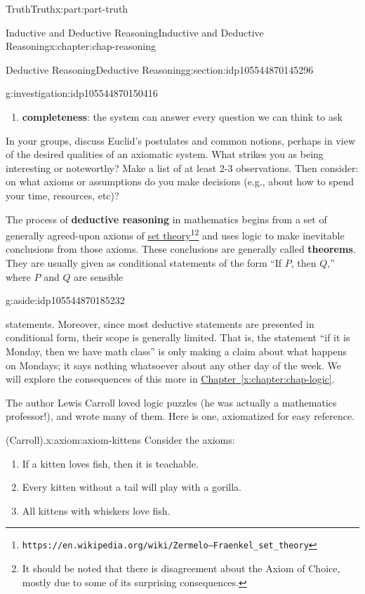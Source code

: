 \documentclass[oneside,10pt,]{book}
\newcommand{\xreffont}{\relax}
\newcommand{\terminology}[1]{\textbf{#1}}
\numberwithin{equation}{section}
\begin{document}
\begin{partptx}{Truth}{}{Truth}{}{}{x:part:part-truth}
\begin{chapterptx}{Inductive and Deductive Reasoning}{}{Inductive and Deductive Reasoning}{}{}{x:chapter:chap-reasoning}
\begin{sectionptx}{Deductive Reasoning}{}{Deductive Reasoning}{}{}{g:section:idp105544870145296}
\begin{investigation}{}{g:investigation:idp105544870150416}
\begin{enumerate}
\item{}\terminology{completeness}: the system can answer every question we can think to ask%
\end{enumerate}
In your groups, discuss Euclid's postulates and common notions, perhaps in view of the desired qualities of an axiomatic system. What strikes you as being interesting or noteworthy? Make a list of at least 2-3 observations. Then consider: on what axioms or assumptions do you make decisions (e.g., about how to spend your time, resources, etc)?%
\end{investigation}%
%
The process of \terminology{deductive reasoning} in mathematics begins from a set of generally agreed-upon axioms of \href{https://en.wikipedia.org/wiki/Zermelo–Fraenkel_set_theory}{set theory}\footnote{\nolinkurl{https://en.wikipedia.org/wiki/Zermelo–Fraenkel_set_theory}\label{g:fn:idp105544870178448}}\footnote{It should be noted that there is disagreement about the Axiom of Choice, mostly due to some of its surprising consequences.\label{g:fn:idp105544870179088}} and uses logic to make inevitable conclusions from those axioms. These conclusions are generally called \terminology{theorems}. They are usually given as conditional statements of the form ``If \(P\), then \(Q\),'' where \(P\) and \(Q\) are sensible\begin{aside}{}{g:aside:idp105544870185232}%
\end{aside}
 statements. Moreover, since most deductive statements are presented in conditional form, their scope is generally limited. That is, the statement ``if it is Monday, then we have math class'' is only making a claim about what happens on Mondays; it says nothing whatsoever about any other day of the week. We will explore the consequences of this more in \hyperref[x:chapter:chap-logic]{Chapter~{\xreffont\ref{x:chapter:chap-logic}}}.%
\par
The author Lewis Carroll loved logic puzzles (he was actually a mathematics professor!), and wrote many of them. Here is one, axiomatized for easy reference.%
\begin{axiom}{(Carroll).}{}{x:axiom:axiom-kittens}%
Consider the axioms:%
%
\begin{enumerate}
\item{}If a kitten loves fish, then it is teachable.%
\item{}Every kitten without a tail will play with a gorilla.%
\item{}All kittens with whiskers love fish.%

\end{enumerate}
\end{axiom}
\end{sectionptx}
\end{chapterptx}
\end{partptx}
\end{document}
